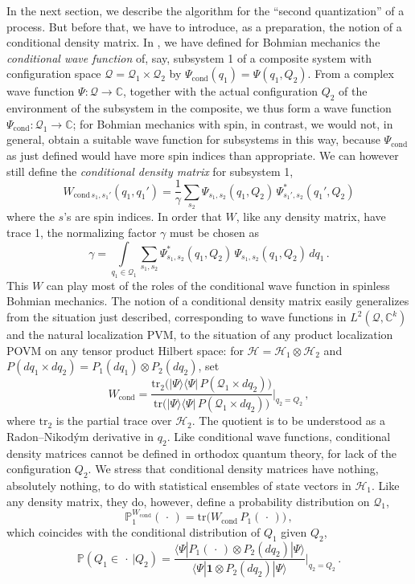 \documentclass[12pt]{article}
\newcommand{\CCC}{\mathbb{C}} %
\newcommand{\1}{\mathbf{1}} %
\newcommand{\tr}{\mathrm{tr}} %
\newcommand{\Hilbert}{\mathscr{H}}
\renewcommand{\sp}[2]{\langle #1 | #2 \rangle} %
\newcommand{\conf}{\mathcal{Q}} %
\newcommand{\measure}{\mathbb{P}} %
\newcommand{\pov}{{P}}%
\newcommand{\cond}{\mathrm{cond}} %
\begin{document}
In the next section, we describe the algorithm for the ``second
quantization'' of a process. But before that, we have to introduce, as
a preparation, the notion of a conditional density matrix. In
\cite{DGZ}, we have defined for Bohmian mechanics the
\emph{conditional wave function} of, say, subsystem 1 of a composite
system with configuration space $\conf = \conf_1 \times \conf_2$ by
$\Psi_\cond(q_1) = \Psi(q_1,Q_2)$.  {}From a complex wave function $\Psi
: \conf \to \CCC$, together with the actual configuration $Q_2$ of the
environment of the subsystem in the composite, we thus form a wave
function $\Psi_\cond: \conf_1 \to \CCC$; for Bohmian mechanics with
spin, in contrast, we would not, in general, obtain a suitable wave
function for subsystems in this way, because $\Psi_\cond$ as just
defined would have more spin indices than appropriate.  We can however
still define the \emph{conditional density matrix} for subsystem 1,
\begin{equation}\label{WPsi}
   W_{\cond \, s_1,s_1'}(q_1,q_1') = \frac{1}{\gamma} \sum_{s_2}
   \Psi_{s_1,s_2} (q_1,Q_2) \, \Psi^*_{s_1',s_2} (q_1', Q_2)
\end{equation}
where the $s$'s are spin indices. In order that $W$, like any
density matrix, have trace 1, the normalizing factor $\gamma$ must be
chosen as
\[
   \gamma = \int\limits_{q_1 \in \conf_1} \sum_{s_1,s_2} \Psi^*_{s_1,s_2}
   (q_1,Q_2) \, \Psi_{s_1,s_2} (q_1,Q_2) \, dq_1\,.
\]
This $W$ can play most of the roles of the conditional wave
function in spinless Bohmian mechanics.  The notion of a conditional
density matrix easily generalizes from the situation just described,
corresponding to wave functions in $L^2(\conf,\CCC^k)$ and the natural
localization PVM, to the situation of any product localization POVM on
any tensor product Hilbert space: for $\Hilbert = \Hilbert_1
\otimes \Hilbert_2$ and $\pov(dq_1 \times dq_2) = \pov_1(dq_1) \otimes
\pov_2(dq_2)$,  set
\begin{equation}\label{WPOV}
   W_\cond = \frac{\tr_2 \big( |\Psi\rangle\langle\Psi| \, \pov
   (\conf_1 \times dq_2) \big)} {\tr \big( |\Psi\rangle\langle\Psi|
   \, \pov(\conf_1 \times dq_2) \big)} \Big|_{q_2 = Q_2}\,,
\end{equation}
where $\tr_2$ is the partial trace over $\Hilbert_2$. The quotient is
to be understood as a Radon--Nikod{\'y}m derivative in $q_2$. Like
conditional wave functions, conditional density matrices cannot be
defined in orthodox quantum theory, for lack of the configuration
$Q_2$.  We stress that conditional density matrices have nothing,
absolutely nothing, to do with statistical ensembles of state vectors
in $\Hilbert_1$. Like any density matrix, they do, however, define a
probability distribution on $\conf_1$,
\begin{equation}\label{PW}
   \measure^{W_\cond}_1 (\,\cdot\,) = \tr \big(W_\cond \,
   \pov_1(\,\cdot\,) \big)\,,
\end{equation}
which coincides with the conditional distribution of $Q_1$ given $Q_2$,
\[
   \measure(Q_1 \in \,\cdot\,|Q_2) = \frac{\sp{\Psi}{\pov_1(\,\cdot\,)
   \otimes \pov_2(dq_2)| \Psi}} {\sp{\Psi}{\1 \otimes \pov_2(dq_2)|
   \Psi}} \Big|_{q_2 = Q_2}\,.
\]
\end{document}
